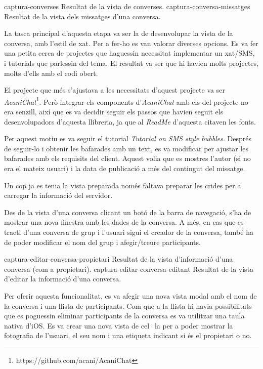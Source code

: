 \pintaDosImatges
    {captura-converses}
        {Resultat de la vista de converses.}
    {captura-conversa-missatges}
        {Resultat de la vista dels missatges d'una conversa.}

La tasca principal d'aquesta etapa va ser la de desenvolupar la vista de la conversa, amb l'estil de xat. Per a fer-ho es van valorar diverses opcions. Es va fer una petita cerca de projectes que haguessin necessitat implementar un xat/SMS, i tutorials que parlessin del tema. El resultat va ser que hi havien molts projectes, molts d'ells amb el codi obert.

El projecte que més s'ajustava a les necessitats d'aquest projecte va ser \textit{AcaniChat}\footnote{https://github.com/acani/AcaniChat}. Però integrar els components d'\textit{AcaniChat} amb els del projecte no era senzill, així que es va decidir seguir els passos que havien seguit els desenvolupadors d'aquesta llibreria, ja que al \textit{ReadMe} d'aquesta citaven les fonts.

Per aquest motiu es va seguir el tutorial \textit{Tutorial on SMS style bubbles}\cite{bubbles_tutorial}. Després de seguir-lo i obtenir les bafarades amb un text, es va modificar per ajustar les bafarades amb els requisits del client. Aquest volia que es mostres l'autor (si no era el mateix usuari) i la data de publicació a més del contingut del missatge.

Un cop ja es tenia la vista preparada només faltava preparar les crides per a carregar la informació del servidor.

Des de la vista d'una conversa clicant un botó de la barra de navegació, s'ha de mostrar una nova finestra amb les dades de la conversa. A més, en cas que es tracti d'una conversa de grup i l'usuari sigui el creador de la conversa, també ha de poder modificar el nom del grup i afegir/treure participants. 

\pintaDosImatges
    {captura-editar-conversa-propietari}
        {Resultat de la vista d'informació d'una conversa (com a propietari).}
    {captura-editar-conversa-editant}
        {Resultat de la vista d'editar la informació d'una conversa.}

Per oferir aquesta funcionalitat, es va afegir una nova vista modal amb el nom de la conversa i una llista de participants. Com que a la llista hi havia possibilitats que es poguessin eliminar participants de la conversa es va utilitzar una taula nativa d'iOS. Es va crear una nova vista de cel·la per a poder mostrar la fotografia de l'usuari, el seu nom i una etiqueta indicant si és el propietari o no.

